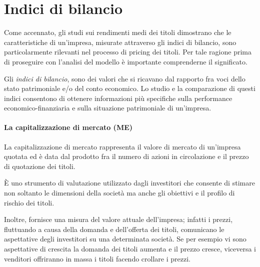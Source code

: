   

\section{Indici di bilancio}

Come accennato, gli studi sui rendimenti medi dei titoli dimostrano che le caratteristiche di un'impresa, misurate attraverso gli indici di bilancio, sono particolarmente rilevanti nel processo di pricing dei titoli. Per tale ragione prima di proseguire con l'analisi del modello è importante comprenderne il significato.

Gli \textit{indici di bilancio}, sono dei valori che si ricavano dal rapporto fra voci dello stato patrimoniale e/o del conto economico. Lo studio e la comparazione di questi indici consentono di ottenere informazioni più specifiche sulla performance economico-finanziaria e sulla situazione patrimoniale di un'impresa.

\paragraph{La capitalizzazione di mercato (ME)}

La capitalizzazione di mercato rappresenta il valore di mercato di un'impresa quotata ed è data dal prodotto fra il numero di azioni in circolazione e il prezzo di quotazione dei titoli. 

\`E uno strumento di valutazione utilizzato dagli investitori che consente di stimare non soltanto le dimensioni della società ma anche gli obiettivi e il profilo di rischio dei titoli. 

Inoltre, fornisce una misura del valore attuale dell'impresa; infatti i prezzi, fluttuando a causa della domanda e dell'offerta dei titoli, comunicano le aspettative degli investitori su una determinata società. Se per esempio vi sono aspettative di crescita la domanda dei titoli aumenta e il prezzo cresce, viceversa i venditori offriranno in massa i titoli facendo crollare i prezzi. 

